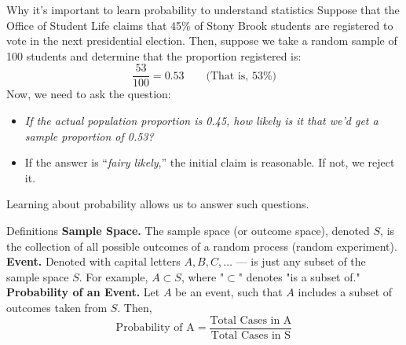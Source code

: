 \documentclass[handout]{beamer} %
\begin{document}

\begin{frame}{Why it’s important to learn probability to understand statistics}
    Suppose that the Office of Student Life claims that 45\% of Stony Brook students are registered to vote in the next presidential election. \pause Then, suppose we take a random sample of 100 students and determine that the proportion registered is:
    \[
    \frac{53}{100} = 0.53 \quad \quad  \text{(That is, 53\%)}
    \] \pause
    Now, we need to ask the question: \
    \begin{itemize}
        \item \emph{If the actual population proportion is 0.45, how likely is it that we’d get a sample proportion of 0.53?} \pause
        \item If the answer is “\emph{fairy likely},” the initial claim is reasonable. If not, we reject it.  \pause
    \end{itemize}
    Learning about probability allows us to answer such questions.
\end{frame}

\begin{frame}{Definitions}
    \textbf{Sample Space.} The sample space (or outcome space), denoted $S$, is the collection of all possible outcomes of a random process (random experiment). \\ \pause
    \textbf{Event.} Denoted with capital letters $A, B, C, \ldots$ — is just any subset of the sample space $S$. For example, $A \subset S$, where "$\subset$" denotes "is a subset of." \\ \pause
    \textbf{Probability of an Event.} Let $A$ be an event, such that $A$ includes a subset of outcomes taken from $S$. Then, \\ \pause
    \[
    \text{Probability of A} = \frac{\text{Total Cases in A}}{\text{Total Cases in S}}
    \]
\end{frame}
\end{document}
